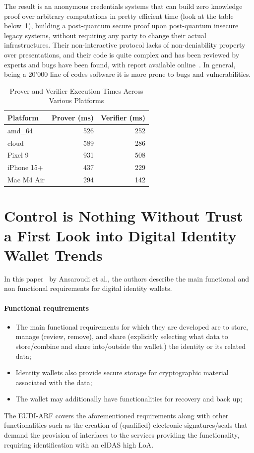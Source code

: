 \documentclass[binding=0.6cm,oneside,noexaminfo]{sapthesis}
\begin{document}
The result is an anonymous credentials systems that can build zero knowledge proof over arbitrary
computations in pretty efficient time (look at the table below~\ref{tab:prover_verifier_perf}), building a post-quantum secure proof upon post-quantum insecure legacy systems, without
requiring any party to change their actual infrastructures. Their non-interactive protocol lacks of
non-deniability property over presentations, and their code is quite complex and has been reviewed by
experts and bugs have been found, with report available online~\cite{TrailOfBits2025GoogleLongfellow}. In general, 
being a 20'000 line of codes software it is more prone to bugs and vulnerabilities.
\begin{table}[htbp]
\centering
\caption{Prover and Verifier Execution Times Across Various Platforms}
\label{tab:prover_verifier_perf}
\begin{tabular}{lrr}
\toprule
\textbf{Platform} & \textbf{Prover (ms)} & \textbf{Verifier (ms)} \\
\midrule
amd\_64     & 526 & 252 \\
cloud      & 589 & 286 \\
Pixel 9    & 931 & 508 \\
iPhone 15+ & 437 & 229 \\
Mac M4 Air & 294 & 142 \\
\bottomrule
\end{tabular}
\end{table}

\section{Control is Nothing Without Trust a First Look into Digital Identity Wallet Trends}
\label{controlisnothingwithouttrust}
In this paper~\cite{Ansaroudi2023Control} by Ansaroudi et al., the authors describe the main 
functional and non functional requirements for digital identity wallets.
\paragraph{Functional requirements}
\begin{itemize}
      \item  The main functional requirements for which they are developed 
      are to store, manage (review, remove), and share (explicitly selecting 
      what data to store/combine and share into/outside the wallet.) 
      the identity or its related data;
      \item Identity wallets also provide secure storage for 
      cryptographic material associated with the data;
      \item The wallet may additionally have functionalities for recovery and back up;
\end{itemize}
The EUDI-ARF covers the aforementioned requirements along with other
functionalities such as the creation of (qualified) electronic signatures/seals that
demand the provision of interfaces to the services providing the functionality,
requiring identification with an eIDAS high LoA.
\end{document}
